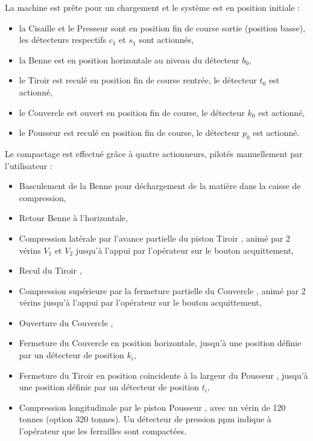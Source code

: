 La machine est prête pour un chargement et le système est en position initiale :
\begin{itemize}
 \item la \og Cisaille \fg et le \og Presseur \fg sont en position fin de course sortie (position basse), les détecteurs respectifs $c_1$ et $s_1$ sont actionnés,
 \item la \og Benne \fg est en position horizontale au niveau du détecteur $b_0$,
 \item le \og Tiroir \fg est reculé en position fin de course rentrée, le détecteur $t_0$ est actionné,
 \item le \og Couvercle \fg est ouvert en position fin de course, le détecteur $k_0$ est actionné,
 \item le \og Pousseur \fg est reculé en position fin de course, le détecteur $p_0$ est actionné.
\end{itemize}

Le compactage est effectué grâce à quatre actionneurs, pilotés manuellement par l'utilisateur :

\begin{itemize}
 \item Basculement de la \og Benne \fg pour déchargement de la matière dans la caisse de compression,
 \item Retour \og Benne \fg à l'horizontale,
 \item Compression latérale par l'avance partielle du piston \og Tiroir \fg, animé par 2 vérins $V_1$ et $V_2$ jusqu'à l'appui par l'opérateur sur le bouton acquittement,
 \item Recul du \og Tiroir \fg,
 \item Compression supérieure par la fermeture partielle du \og Couvercle \fg, animé par 2 vérins jusqu'à l'appui par l'opérateur sur le bouton acquittement,
 \item Ouverture du \og Couvercle \fg,
 \item Fermeture du \og Couvercle \fg en position horizontale, jusqu'à une position définie par un détecteur de position $k_i$,
 \item Fermeture du \og Tiroir \fg en position coïncidente à la largeur du \og Pousseur \fg, jusqu'à une position définie par un détecteur de position $t_i$,
 \item Compression longitudinale par le piston \og Pousseur \fg, avec un vérin de 120 tonnes (option 320 tonnes). Un détecteur de pression ppm indique à l'opérateur que les ferrailles sont compactées.
\end{itemize}


